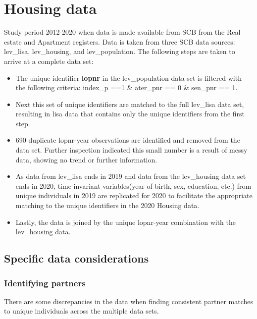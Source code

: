 \documentclass[
]{book}
\begin{document}
\hypertarget{housing-data}{%
\chapter{Housing data}\label{housing-data}}

Study period 2012-2020 when data is made available from SCB from the Real estate and Apartment registers. Data is taken from three SCB data sources: lev\_lisa, lev\_housing, and lev\_population. The following steps are taken to arrive at a complete data set:

\begin{itemize}
\item
  The unique identifier \textbf{lopnr} in the lev\_population data set is filtered with the following criteria: index\_p ==1 \& ater\_pnr == 0 \& sen\_pnr == 1.
\item
  Next this set of unique identifiers are matched to the full lev\_lisa data set, resulting in lisa data that contains only the unique identifiers from the first step.
\item
  690 duplicate lopnr-year observations are identified and removed from the data set. Further inspection indicated this small number is a result of messy data, showing no trend or further information.
\item
  As data from lev\_lisa ends in 2019 and data from the lev\_housing data set ends in 2020, time invariant variables(year of birth, sex, education, etc.) from unique individuals in 2019 are replicated for 2020 to facilitate the appropriate matching to the unique identifiers in the 2020 Housing data.
\item
  Lastly, the data is joined by the unique lopnr-year combination with the lev\_housing data.
\end{itemize}

\hypertarget{specific-data-considerations}{%
\section{Specific data considerations}\label{specific-data-considerations}}

\hypertarget{identifying-partners}{%
\subsection{Identifying partners}\label{identifying-partners}}

There are some discrepancies in the data when finding consistent partner matches to unique individuals across the multiple data sets.
\end{document}
